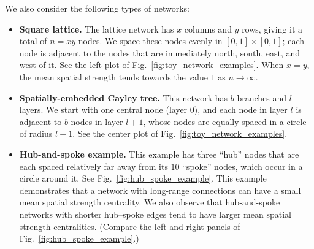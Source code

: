 \documentclass[%
 reprint,
 amsmath,amssymb,
 aps,
]{revtex4-1}
\begin{document}
We also consider the following types of networks:
\begin{itemize}
\item{\textbf{Square lattice.} The lattice network has $x$ columns and $y$ rows, giving it a total of $n = xy$ nodes. We space these nodes evenly in $[0,1] \times [0,1]$; each node is adjacent to the nodes that are immediately north, south, east, and west of it. See the left plot of Fig.~\ref{fig:toy_network_examples}. When $x=y$, the mean spatial strength tends towards the value $1$ as {\color{red}$n \rightarrow \infty$.}
}
\item{\textbf{Spatially-embedded Cayley tree.} This network has $b$ branches and $l$ layers. We start with one central node (layer $0$), and each node in layer $l$ is adjacent to $b$ nodes in layer $l+1$, whose nodes are equally spaced in a circle of radius $l+1$. See the center plot of Fig.~\ref{fig:toy_network_examples}. 
}
\item{\textbf{Hub-and-spoke example.} This example has three ``hub'' nodes that are each spaced relatively far away from its $10$ ``spoke'' nodes, which occur in a circle around it. See Fig.~\ref{fig:hub_spoke_example}. This example demonstrates that a network with long-range connections can have a small mean spatial strength centrality. We also observe that hub-and-spoke networks with shorter hub--spoke edges tend to have larger mean spatial strength centralities. (Compare the left and right panels of Fig.~\ref{fig:hub_spoke_example}.)

}
\end{itemize}
\end{document}
